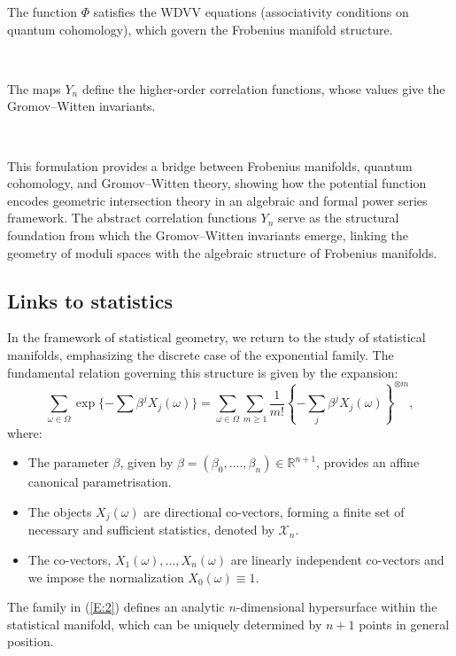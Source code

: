  The function $\Phi$ satisfies the WDVV equations (associativity conditions on quantum cohomology), which govern the Frobenius manifold structure.

\,

The maps $Y_n$ define the higher-order correlation functions, whose values give the Gromov–Witten invariants.

\, 

This formulation provides a bridge between Frobenius manifolds, quantum cohomology, and Gromov–Witten theory, showing how the potential function encodes geometric intersection theory in an algebraic and formal power series framework. The abstract correlation functions $Y_n$	
  serve as the structural foundation from which the Gromov–Witten invariants emerge, linking the geometry of moduli spaces with the algebraic structure of Frobenius manifolds.

  \subsection{Links to statistics}
In the framework of statistical geometry, we return to the study of statistical manifolds, emphasizing the discrete case of the exponential family. The fundamental relation governing this structure is given by the expansion:
\begin{equation}\label{E:2}\sum_{\omega\in \Omega} \exp\{-\sum \beta^jX_j(\omega)\}=
\sum_{\omega\in \Omega}\sum_{m\geq 1}\frac{1}{m!}\left\{ -\sum_{j} \beta^jX_j(\omega)\right\}^{\otimes m}, \end{equation}
where:

\begin{itemize}
    \item The parameter $\beta$, given by $\beta=(\beta_0,....,\beta_n)\in \mathbb{R}^{n+1}$, provides an   affine canonical parametrisation.
    \item The objects $X_j(\omega)$ are directional co-vectors, 
    forming a finite set of necessary and sufficient statistics, denoted by $\mathcal{X}_n$. 
    \item The co-vectors, $X_1(\omega),\dots ,X_{n}(\omega)$ are linearly independent co-vectors and we impose the normalization $X_0(\omega)\equiv 1$. %
\end{itemize}
The family in (\ref{E:2}) defines an analytic $n$-dimensional hypersurface within the statistical manifold, which can be uniquely determined by $n+1$ points in general position. 

